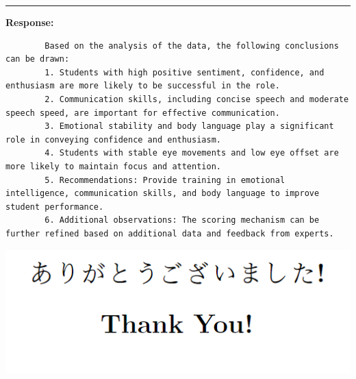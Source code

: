 \documentclass[11pt,a4paper]{article}
\begin{document}
\begin{center}
    \color{red}\rule{1\linewidth}{0.5mm}
\end{center}

\textbf{Response:}
\begin{tcolorbox}[title=Response]
    \begin{lstlisting}
        Based on the analysis of the data, the following conclusions can be drawn:
        1. Students with high positive sentiment, confidence, and enthusiasm are more likely to be successful in the role.
        2. Communication skills, including concise speech and moderate speech speed, are important for effective communication.
        3. Emotional stability and body language play a significant role in conveying confidence and enthusiasm.
        4. Students with stable eye movements and low eye offset are more likely to maintain focus and attention.
        5. Recommendations: Provide training in emotional intelligence, communication skills, and body language to improve student performance.
        6. Additional observations: The scoring mechanism can be further refined based on additional data and feedback from experts.
    \end{lstlisting}
\end{tcolorbox}

\vfill

\begin{center}
    \includegraphics[width=1\columnwidth]{images/thank.png}
\end{center}
\vfill


\end{document}
